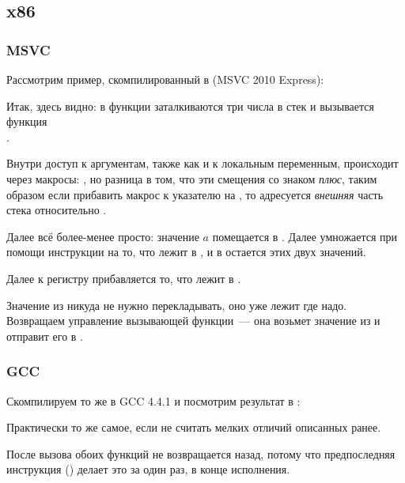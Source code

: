 \subsection{x86}

\subsubsection{MSVC}

Рассмотрим пример, скомпилированный в (MSVC 2010 Express):



Итак, здесь видно: в функции \main заталкиваются три числа в стек и вызывается функция \\
.
 
Внутри \ttf доступ к аргументам, также как и к локальным переменным, происходит через макросы: 
, но разница в том, что эти смещения со знаком \emph{плюс}, 
таким образом если прибавить макрос  к указателю на \EBP, то адресуется \emph{внешняя} 
часть  стека относительно \EBP.

Далее всё более-менее просто: значение $a$ помещается в \EAX. 
Далее \EAX умножается при помощи инструкции \IMUL на то, что лежит в , 
и в \EAX остается  этих двух значений.

Далее к регистру \EAX прибавляется то, что лежит в .

Значение из \EAX никуда не нужно перекладывать, оно уже лежит где надо. 
Возвращаем управление вызывающей функции~--- она возьмет значение из \EAX и отправит его в \printf.



\subsubsection{GCC}

Скомпилируем то же в GCC 4.4.1 и посмотрим результат в \IDA:



Практически то же самое, если не считать мелких отличий описанных ранее.

После вызова обоих функций  не возвращается назад, 
потому что предпоследняя инструкция  () делает это за один раз, в конце исполнения.

